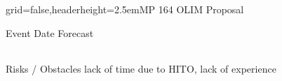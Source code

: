 \documentclass[english]{kiesgrube}
\begin{document}
\begin{poster}{grid=false,headerheight=2.5em}{}{MP 164 OLIM Proposal}{}{}
\fi
\begin{posterbox}[name=event,below=progress,]{Event Date Forecast}
\begin{tabulary}{\textwidth}{lL}
\end{tabulary}
\end{posterbox}
\begin{posterbox}[name=event,below=event]{Risks / Obstacles}
lack of time due to HITO, lack of experience
\end{posterbox}
\footer{}
\end{poster}

\newpage
\end{document}
